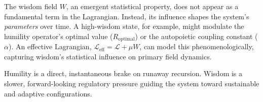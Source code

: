 The wisdom field \(W\), an emergent statistical property, does not appear as a fundamental term in the Lagrangian. Instead, its influence shapes the system's \textit{parameters} over time. A high-wisdom state, for example, might modulate the humility operator's optimal value (\(R_{\text{optimal}}\)) or the autopoietic coupling constant (\(\alpha\)). An effective Lagrangian, \(\mathcal{L}_{\text{eff}} = \mathcal{L} + \mu W\), can model this phenomenologically, capturing wisdom's statistical influence on primary field dynamics.

Humility is a direct, instantaneous brake on runaway recursion. Wisdom is a slower, forward-looking regulatory pressure guiding the system toward sustainable and adaptive configurations.